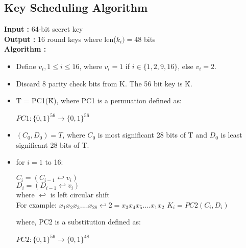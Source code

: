 \documentclass[11pt]{article}
\begin{document}
\subsection{Key Scheduling Algorithm}
\textbf{Input : } 64-bit secret key\\
\textbf{Output : } 16 round keys where len($k_i) = 48 $ bits\\
\vspace{3mm}
\textbf{Algorithm :}
\begin{itemize}
    \item Define $v_i, 1 \leq i \leq 16$, where $v_i = 1$ if $i \in \{1, 2, 9, 16\}$, else $v_i = 2$. 
    \item Discard 8 parity check bits from K. The 56 bit key is \~{K}.
    \item T = PC1(\~{K}), where PC1 is a permuation defined as:
    \begin{center}
        $PC1: \{0, 1\}^{56} \rightarrow \{0, 1\}^{56}$\\
    \end{center}

    \item $(C_0, D_0) = T$, where $C_0$ is most significant 28 bits of T and $D_0$ is least significant 28 bits of T.

    \item for $i = 1$ to 16:
    \begin{center}
        $C_i = (C_{i-1} \hookleftarrow v_i)$\\
        $D_i = (D_{i-1} \hookleftarrow v_i)$\\
        where $\hookleftarrow$ is left circular shift\\
        For example: $x_1x_2x_3....x_28 \hookleftarrow 2 = x_3x_4x_5....x_1x_2 $
        $K_i = PC2(C_i, D_i)$\\
    \end{center}
    where, PC2 is a substitution defined as:
    \begin{center}
        $PC2: \{0, 1\}^{56} \rightarrow \{0, 1\}^{48}$\\
    \end{center}
\end{itemize}
\end{document}
